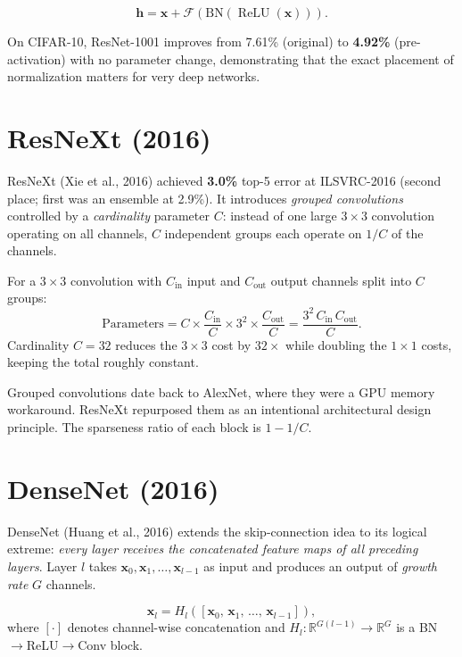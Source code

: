 \documentclass[11pt, oneside]{book}
\newcommand{\R}{\mathbb{R}}
\newcommand{\xvec}{\mathbf{x}}
\newcommand{\hvec}{\mathbf{h}}
\DeclareMathOperator{\relu}{ReLU}
\begin{document}
\[
  \hvec = \xvec + \mathcal{F}\!\left(\mathrm{BN}\!\left(\relu(\xvec)\right)\right).
\]

On CIFAR-10, ResNet-1001 improves from 7.61\% (original) to \textbf{4.92\%} (pre-activation)
with no parameter change, demonstrating that the exact placement of normalization
matters for very deep networks.

\section{ResNeXt (2016)}

ResNeXt (Xie et al., 2016) achieved \textbf{3.0\%} top-5 error at ILSVRC-2016
(second place; first was an ensemble at 2.9\%).
It introduces \emph{grouped convolutions} controlled by a \emph{cardinality} parameter $C$:
instead of one large $3\times3$ convolution operating on all channels,
$C$ independent groups each operate on $1/C$ of the channels.

\begin{thmbox}[title={Grouped Convolution Parameter Count}]
For a $3\times3$ convolution with $C_\mathrm{in}$ input and $C_\mathrm{out}$ output channels
split into $C$ groups:
\[
  \text{Parameters} = C \times \frac{C_\mathrm{in}}{C} \times 3^2 \times \frac{C_\mathrm{out}}{C}
  = \frac{3^2\, C_\mathrm{in}\, C_\mathrm{out}}{C}.
\]
Cardinality $C=32$ reduces the $3\times3$ cost by $32\times$ while
doubling the $1\times1$ costs, keeping the total roughly constant.
\end{thmbox}

Grouped convolutions date back to AlexNet, where they were a GPU memory workaround.
ResNeXt repurposed them as an intentional architectural design principle.
The sparseness ratio of each block is $1 - 1/C$.

\section{DenseNet (2016)}

DenseNet (Huang et al., 2016) extends the skip-connection idea to its logical extreme:
\emph{every layer receives the concatenated feature maps of all preceding layers}.
Layer $l$ takes $\mathbf{x}_0, \mathbf{x}_1, \ldots, \mathbf{x}_{l-1}$ as input
and produces an output of \emph{growth rate} $G$ channels.

\begin{defbox}[title={Dense Block Connectivity}]
\[
  \mathbf{x}_l = H_l\!\left([\mathbf{x}_0,\, \mathbf{x}_1,\, \ldots,\, \mathbf{x}_{l-1}]\right),
\]
where $[\cdot]$ denotes channel-wise concatenation and
$H_l : \R^{G(l-1)} \to \R^G$ is a BN$\to$ReLU$\to$Conv block.
\end{defbox}
\end{document}
